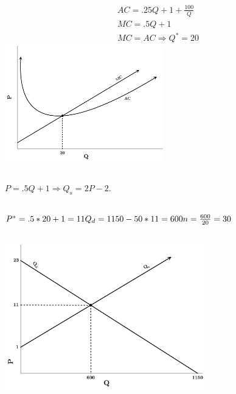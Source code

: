 \documentclass{article}
\begin{document}
\section[4]{}
	\subsection[a]{}
		\begin{align*}
			AC=.25Q+1+\frac{100}{Q}\\
			MC=.5Q+1\\
			MC = AC \Rightarrow Q^*=20
		\end{align*}
		\includegraphics[height=2in]{Charts/4a}
	\subsection[b]{}
		$P=.5Q+1 \Rightarrow Q_s=2P-2.$
	\subsection[c]{}
		$P^*=.5*20+1=11\\
		Q_d=1150-50*11=600\\
		n=\frac{600}{20}=30$
	\subsection[d]{}
		\includegraphics[height=2.5in]{Charts/4d}
\end{document}
